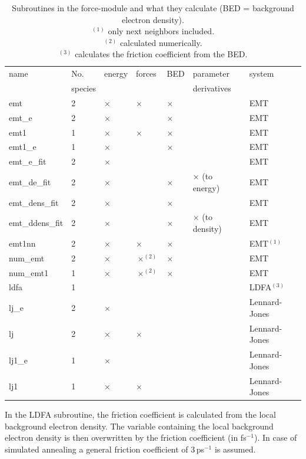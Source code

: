 \documentclass[twoside, 11pt, titlepage, captions=nooneline, a4paper, headsepline]{scrbook}%
\begin{document}
\begin{table}[b!]
\centering
\caption{Subroutines in the force-module and what they calculate (BED = background electron density).\\
$^{(1)}$ only next neighbors included.\\
$^{(2)}$ calculated numerically.\\
$^{(3)}$ calculates the friction coefficient from the BED.}
\label{Tab:Funct:force}
\begin{tabular}{lllllll}
\hline\hline
name			&No.	& energy	&forces			&BED		&parameter	& system\\
&species&&&&derivatives&\\
\hline
emt				&2				&$\times$	&$\times$		&$\times$	&						&EMT\\
emt\_e 			&2 				&$\times$	&				&$\times$	&						&EMT\\
emt1			&1				&$\times$	&$\times$		&$\times$	&						&EMT\\
emt1\_e 		&1				&$\times$	&				&$\times$	&						&EMT\\
emt\_e\_fit 	&2 				&$\times$	&				&			&						&EMT\\
emt\_de\_fit 	&2				&$\times$	&				&$\times$	&$\times$ (to energy)	&EMT\\
emt\_dens\_fit	&2				&$\times$	&				&$\times$	&						&EMT\\
emt\_ddens\_fit	&2				&$\times$	&				&$\times$	&$\times$ (to density)	&EMT\\
emt1nn			&2				&$\times$	&$\times$		&$\times$	&						&EMT$^{(1)}$\\
num\_emt		&2				&$\times$	&$\times^{(2)}$	&$\times$	&						&EMT\\
num\_emt1		&1				&$\times$	&$\times^{(2)}$	&$\times$	&						&EMT\\
ldfa			&1				&			&				&			&						&LDFA$^{(3)}$\\
lj\_e			&2				&$\times$	&				&			&						&Lennard-Jones\\
lj				&2				&$\times$	&$\times$		&			&						&Lennard-Jones\\
lj1\_e			&1				&$\times$	&				&			&						&Lennard-Jones\\
lj1				&1				&$\times$	&$\times$		&			&						&Lennard-Jones\\

\hline
\hline
\end{tabular}
\end{table}

In the LDFA subroutine, the friction coefficient is calculated from the local background electron density. The variable containing the local background electron density is then overwritten by the friction coefficient (in fs$^{-1}$). In case of simulated annealing a general friction coefficient of 3\,ps$^{-1}$ is assumed.
\end{document}
